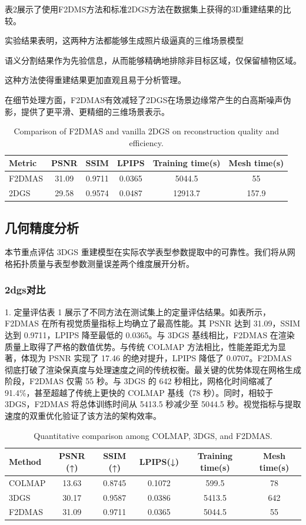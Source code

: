 \documentclass[preprint,12pt]{elsarticle}
\begin{document}
表2展示了使用F2DMS方法和标准2DGS方法在数据集上获得的3D重建结果的比较。

实验结果表明，这两种方法都能够生成照片级逼真的三维场景模型

语义分割结果作为先验信息，从而能够精确地排除非目标区域，仅保留植物区域。

这种方法使得重建结果更加直观且易于分析管理。

在细节处理方面，F2DMAS有效减轻了2DGS在场景边缘常产生的白高斯噪声伪影，提供了更平滑、更精细的三维场景表示。

\begin{table}[t]
\centering
\caption{Comparison of F2DMAS and vanilla 2DGS on reconstruction quality and efficiency.}
\label{tab:2}
\begin{tabular}{lccccc}
\toprule
Metric & PSNR & SSIM & LPIPS & Training time(s) & Mesh time(s) \\
\midrule
F2DMAS & 31.09 & 0.9711 & 0.0365 & 5044.5 & 55 \\
2DGS & 29.58 & 0.9574 & 0.0487 & 12913.7 & 157.9 \\
\bottomrule
\end{tabular}
\end{table}

\subsection{几何精度分析}

本节重点评估 3DGS 重建模型在实际农学表型参数提取中的可靠性。我们将从网格拓扑质量与表型参数测量误差两个维度展开分析。

\subsubsection{2dgs对比}

1. 定量评估表 1 展示了不同方法在测试集上的定量评估结果。如表所示，F2DMAS 在所有视觉质量指标上均确立了最高性能。其 PSNR 达到 31.09，SSIM 达到 0.9711，LPIPS 降至最低的 0.0365。与 3DGS 基线相比，F2DMAS 在渲染质量上取得了严格的数值优势。与传统 COLMAP 方法相比，性能差距尤为显著，体现为 PSNR 实现了 17.46 的绝对提升，LPIPS 降低了 0.0707。F2DMAS 彻底打破了渲染保真度与处理速度之间的传统权衡。最关键的优势体现在网格生成阶段，F2DMAS 仅需 55 秒。与 3DGS 的 642 秒相比，网格化时间缩减了 91.4\%，甚至超越了传统上更快的 COLMAP 基线（78 秒）。同时，相较于 3DGS，F2DMAS 将总体训练时间从 5413.5 秒减少至 5044.5 秒。视觉指标与提取速度的双重优化验证了该方法的架构效率。

\begin{table}[t]
\centering
\caption{Quantitative comparison among COLMAP, 3DGS, and F2DMAS.}
\label{tab:3}
\begin{tabular}{lccccc}
\toprule
Method & PSNR (↑) & SSIM (↑) & LPIPS(↓) & Training time(s) & Mesh time(s) \\
\midrule
COLMAP & 13.63 & 0.8745 & 0.1072 & 599.5 & 78 \\
3DGS & 30.17 & 0.9587 & 0.0386 & 5413.5 & 642 \\
F2DMAS & 31.09 & 0.9711 & 0.0365 & 5044.5 & 55 \\
\bottomrule
\end{tabular}
\end{table}
\end{document}
